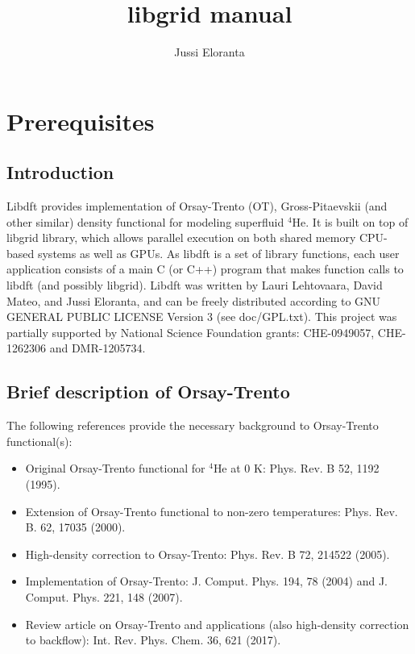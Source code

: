 \documentclass[12pt,letterpaper]{report}
\author{Jussi Eloranta}
\title{libgrid manual}
\begin{document}
\maketitle

\chapter{Prerequisites}

\section{Introduction}

Libdft provides implementation of Orsay-Trento (OT), Gross-Pitaevskii (and other 
similar) density functional for modeling superfluid $^4$He. It is built on top 
of libgrid library, which allows parallel execution on both shared memory 
CPU-based systems as well as GPUs. As libdft is a set of library functions,
each user application consists of a main C (or C++) program that makes
function calls to libdft (and possibly libgrid). 
Libdft was written by Lauri Lehtovaara, David Mateo, and Jussi Eloranta, and 
can be freely distributed according to GNU GENERAL PUBLIC LICENSE Version 3 
(see doc/GPL.txt). This project was partially supported by National Science 
Foundation grants: CHE-0949057, CHE-1262306 and DMR-1205734.

\section{Brief description of Orsay-Trento}

The following references provide the necessary background to Orsay-Trento functional(s):
\begin{itemize}
\item Original Orsay-Trento functional for $^4$He at 0 K: Phys. Rev. B 52, 1192 (1995).
\item Extension of Orsay-Trento functional to non-zero temperatures: Phys. Rev. B. 62, 17035 (2000).
\item High-density correction to Orsay-Trento: Phys. Rev. B 72, 214522 (2005).
\item Implementation of Orsay-Trento: J. Comput. Phys. 194, 78 (2004) and J. Comput. Phys. 221, 148 (2007).
\item Review article on Orsay-Trento and applications (also high-density correction to backflow): Int. Rev. Phys. Chem. 
36, 621 (2017).
\end{itemize}
\end{document}
